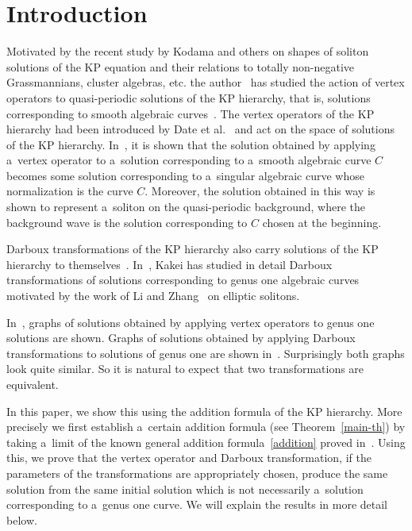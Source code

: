 \documentclass[pdftex]{sigma}
\numberwithin{equation}{section}
\theoremstyle{definition}
\begin{document}
\section{Introduction}
Motivated by the recent study by Kodama and others
\cite{CK2008,Kodama2017, KW2011,KW2014} on shapes of soliton solutions of the KP equation and their relations to totally non-negative Grassmannians, cluster algebras, etc. the author~\cite{Nak2024} has studied the action of vertex operators to quasi-periodic solutions of the KP hierarchy, that is, solutions corresponding to smooth algebraic curves~\cite{Krichever1977,Segal-Wilson1985}. The vertex operators of the KP hierarchy had been introduced
by Date et al.\ \cite{DJKM} and act on the space of solutions of the KP hierarchy. In~\cite{Nak2024}, it is shown that the solution obtained by applying a~vertex operator to a~solution corresponding to a~smooth algebraic curve $C$
becomes some solution corresponding to a~singular algebraic curve whose normalization is the curve $C$.
Moreover, the solution obtained in this way is shown to represent a~soliton on the quasi-periodic background, where the background wave is the solution corresponding to $C$ chosen at the beginning.

Darboux transformations of the KP hierarchy also carry solutions of the KP hierarchy to
themselves~\cite{H-van-de-Leur2001,Kakei,Matveev-Salle1991,Ovel1993}. In~\cite{Kakei}, Kakei has studied in detail Darboux transformations of
solutions corresponding to genus one algebraic curves motivated by the work of Li and Zhang~\cite{Li-Zhang2022} on elliptic solitons.

In~\cite{Nak2024}, graphs of solutions obtained by applying vertex operators
to genus one solutions are shown. Graphs of solutions obtained by applying Darboux transformations to solutions of genus one are shown in~\cite{Kakei}.
Surprisingly both graphs look quite similar.
So it is natural to expect that two transformations are equivalent.

In this paper, we show this using the addition formula of the KP hierarchy.
More precisely we first establish a~certain addition formula
 (see Theorem~\ref{main-th}) by taking a~limit of the known general addition
formula~\eqref{addition} proved in~\cite{Shigyo2013}.
Using this, we prove that the vertex operator and Darboux transformation, if the parameters of the
transformations are appropriately chosen, produce the same solution
from the same initial solution which is not necessarily a~solution corresponding to a~genus one curve. We will explain the results in more detail below.
\end{document}
